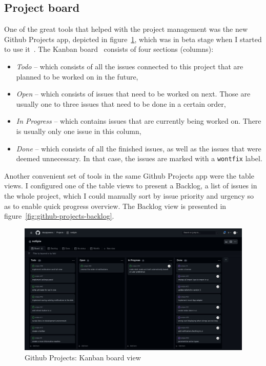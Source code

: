 \subsection{Project board}\label{sec:project-board}

One of the great tools that helped with the project management
was the new Github Projects app,
depicted in figure~\ref{fig:github-projects-kanban},
which was in beta stage
when I started to use it~\cite{github_inc_github_2022}.
The Kanban board~\cite{goddard_kanban_2022} consists of four sections (columns):

\begin{itemize}
      \item
            \textit{Todo} -- which consists of all the issues
            connected to this project
            that are planned to be worked on in the future,
      \item
            \textit{Open} -- which consists of issues
            that need to be worked on next.
            Those are usually one to three issues
            that need to be done in a certain order,
      \item
            \textit{In Progress} -- which contains issues
            that are currently being worked on.
            There is usually only one issue in this column,
      \item
            \textit{Done} -- which consists of all the finished issues,
            as well as the issues that were deemed unnecessary.
            In that case, the issues are marked with a \texttt{wontfix} label.
\end{itemize}

Another convenient set of tools in the same Github Projects app
were the table views.
I configured one of the table views to present a Backlog,
a list of issues in the whole project,
which I could manually sort by
issue priority and urgency
so as to enable quick progress overview.
The Backlog view is presented in figure~\ref{fig:github-projects-backlog}.

\begin{figure}[h]
      \centering
      \includegraphics[width=\linewidth,keepaspectratio]{img/kanban_board.jpg}
      \caption{Github Projects: Kanban board view}
      \label{fig:github-projects-kanban}
\end{figure}

